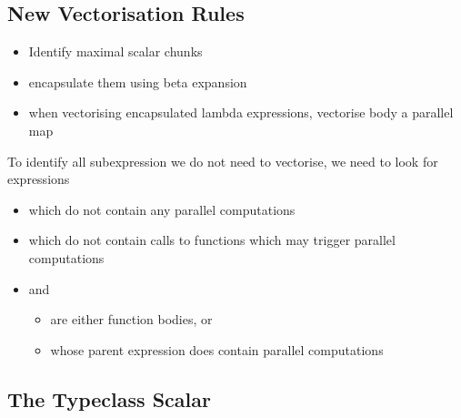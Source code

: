 \subsection{New Vectorisation Rules}

\begin{itemize}
	\item Identify maximal scalar chunks
	\item encapsulate them using beta expansion
	\item when vectorising encapsulated lambda expressions, vectorise body a parallel map
\end{itemize}


To identify all subexpression we do not need to vectorise, we need to look for expressions 
\begin{itemize}
\item which do not contain any parallel computations
\item which do not contain calls to functions which may trigger parallel computations
\item and 
  \begin{itemize}	
	\item are either function bodies, or
	\item whose parent expression does contain parallel computations
  \end{itemize}	
 \end{itemize}


\subsection{The Typeclass Scalar}
\label{Subsection:AlgScalar}